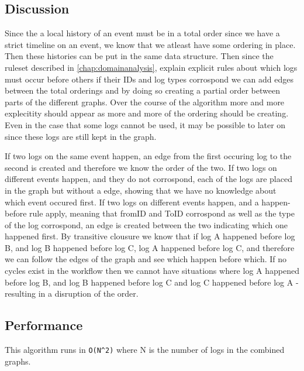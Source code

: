 \subsection{Discussion} %
Since the a local history of an event must be in a total order since we have a strict timeline on an event, we know that we atleast have some ordering in place. Then these histories can be put in the same data structure. Then since the ruleset described in \autoref{chap:domainanalysis}, explain explicit rules about which logs must occur before others if their IDs and log types corrospond we can add edges between the total orderings and by doing so creating a partial order between parts of the different graphs. Over the course of the algorithm more and more explecitity should appear as more and more of the ordering should be creating. Even in the case that some logs cannot be used, it may be possible to later on since these logs are still kept in the graph. %

\newpar If two logs on the same event happen, an edge from the first occuring log to the second is created and therefore we know the order of the two. 
If two logs on different events happen, and they do not corrospond, each of the logs are placed in the graph but without a edge, showing that we have no knowledge about which event occured first.
If two logs on different events happen, and a happen-before rule apply, meaning that fromID and ToID corrospond as well as the type of the log corrospond, an edge is created between the two indicating which one happened first. 
By transitive clousure we know that if log A happened before log B, and log B happened before log C, log A happened before log C, and therefore we can follow the edges of the graph and see which happen before which.
If no cycles exist in the workflow then we cannot have situations where log A happened before log B, and log B happened before log C and log C happened before log A - resulting in a disruption of the order. %

\subsection{Performance} %
This algorithm runs in \texttt{O(N^2)} where N is the number of logs in the combined graphs.


